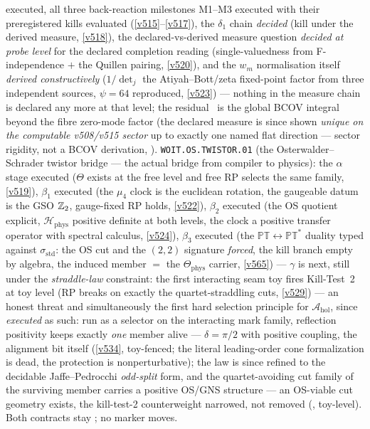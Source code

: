 \begin{keybox}
executed, all three back-reaction milestones M1--M3 executed with their preregistered kills
evaluated (\vref{v515}--\vref{v517}), the $\delta_1$ chain \emph{decided} (kill under the
derived measure, \vref{v518}), the declared-vs-derived measure question \emph{decided at probe
level} for the declared completion reading (single-valuedness from F-independence $+$ the
Quillen pairing, \vref{v520}), and the $w_m$ normalisation itself \emph{derived constructively}
($1/\det_j$ the Atiyah--Bott/zeta fixed-point factor from three independent sources, $\psi=64$
reproduced, \vref{v523}) --- nothing in the measure chain is declared any more at that level;
the residual \mO\ is the global BCOV integral beyond the fibre zero-mode factor (the declared
measure is since shown \emph{unique on the computable v508/v515 sector} up to exactly one
named flat direction --- sector rigidity, not a BCOV derivation,
).
\texttt{WOIT.OS.TWISTOR.01} (the Osterwalder--Schrader twistor bridge --- the actual bridge
from compiler to physics): the $\alpha$ stage executed ($\Theta$ exists at the free level and
free RP selects the same family, \vref{v519}), $\beta_1$ executed (the $\mu_4$ clock is the
euclidean rotation, the gaugeable datum is the GSO $\mathbb Z_2$, gauge-fixed RP holds, \vref{v522}),
$\beta_2$ executed (the OS quotient explicit, $\mathcal H_{\mathrm{phys}}$ positive definite at
both levels, the clock a positive transfer operator with spectral calculus, \vref{v524}),
$\beta_3$ executed (the $\mathbb{PT}\leftrightarrow\mathbb{PT}^*$ duality typed against
$\sigma_{\mathrm{std}}$: the OS cut and the $(2,2)$ signature \emph{forced}, the kill branch
empty by algebra, the induced member $=$ the $\Theta_{\mathrm{phys}}$ carrier, \vref{v565}) ---
$\gamma$ is next, still under the \emph{straddle-law} constraint: the first interacting seam toy
fires Kill-Test~2 at toy level (RP breaks on exactly the quartet-straddling cuts,
\vref{v529}) --- an honest threat and simultaneously the first hard selection principle for
$\mathcal A_{\mathrm{hol}}$, since \emph{executed} as such: run as a selector on the interacting
mark family, reflection positivity keeps exactly \emph{one} member alive --- $\delta=\pi/2$ with
positive coupling, the alignment bit itself (\vref{v534}, toy-fenced; the literal leading-order
cone formalization is dead, the protection is nonperturbative); the law is since refined to the
decidable Jaffe--Pedrocchi \emph{odd-split} form, and the quartet-avoiding cut family of the
surviving member carries a positive OS/GNS structure --- an OS-viable cut geometry exists, the
kill-test-2 counterweight narrowed, not removed
(, toy-level). Both contracts stay \mO; no
marker moves.
\end{keybox}

